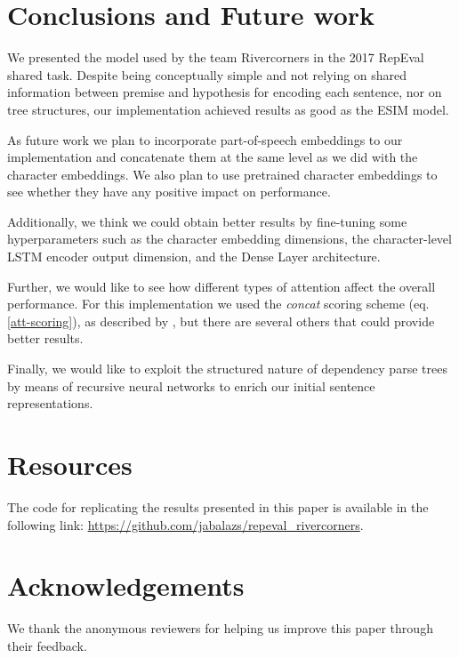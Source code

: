 \documentclass[11pt,letterpaper]{article}
\begin{document}
\section{Conclusions and  Future work}

We presented the model used by the team Rivercorners in the 2017 RepEval shared task. Despite being conceptually simple and not relying on shared information between premise and hypothesis for encoding each sentence, nor on tree structures, our implementation achieved results as good as the ESIM model.

As future work we plan to incorporate part-of-speech embeddings to our implementation and concatenate them at the same level as we did with the character embeddings. We also plan to use pretrained character embeddings to see whether they have any positive impact on performance.

Additionally, we think we could obtain better results by fine-tuning some hyperparameters such as the character embedding dimensions, the character-level LSTM encoder output dimension, and the Dense Layer architecture.


Further, we would like to see how different types of attention affect the overall performance. For this implementation we used the \emph{concat} scoring scheme (eq. \ref{att-scoring}), as described by , but there are several others that could provide better results.

Finally, we would like to exploit the structured nature of dependency parse trees by means of recursive neural networks \cite{tai2015improved} to enrich our initial sentence representations.

\section{Resources}
The code for replicating the results presented in this paper is available in the following link: \url{https://github.com/jabalazs/repeval_rivercorners}.

\section{Acknowledgements}
We thank the anonymous reviewers for helping us improve this paper through their feedback.

%
%
%
%

\newpage



\end{document}
